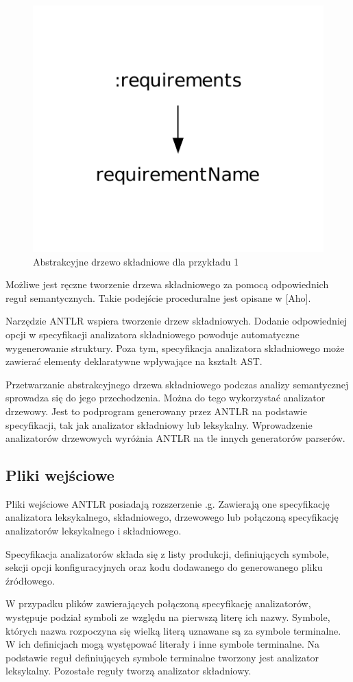 \begin{figure}[h!]
  \centering
    \includegraphics[scale=0.8]{img/antlr_ast.pdf}
    \caption{Abstrakcyjne drzewo składniowe dla przykładu 1}
    \label{antlr_ast}
\end{figure}


Możliwe jest ręczne tworzenie drzewa składniowego za pomocą odpowiednich
reguł semantycznych. Takie podejście proceduralne jest opisane w [Aho].

Narzędzie ANTLR wspiera tworzenie drzew składniowych. Dodanie
odpowiedniej opcji w specyfikacji analizatora składniowego powoduje automatyczne
wygenerowanie struktury. Poza tym, specyfikacja analizatora składniowego
 może zawierać elementy deklaratywne wpływające na kształt AST.


Przetwarzanie abstrakcyjnego drzewa składniowego podczas analizy semantycznej
sprowadza się do jego przechodzenia. Można do tego wykorzystać analizator drzewowy. 
Jest to podprogram generowany przez
ANTLR na podstawie specyfikacji, tak jak analizator składniowy lub leksykalny.
Wprowadzenie analizatorów drzewowych wyróżnia ANTLR na tle innych generatorów
 parserów. 

\subsection{Pliki wejściowe}

Pliki wejściowe ANTLR posiadają rozszerzenie .g. Zawierają one specyfikację
analizatora leksykalnego, składniowego, drzewowego lub połączoną specyfikację
analizatorów leksykalnego i składniowego. 

Specyfikacja analizatorów składa się z listy produkcji, definiujących symbole,
 sekcji opcji konfiguracyjnych oraz kodu dodawanego do generowanego
pliku źródłowego.

W przypadku plików zawierających połączoną specyfikację analizatorów, występuje
podział symboli ze względu na pierwszą literę ich nazwy.
 Symbole, których nazwa rozpoczyna się wielką literą uznawane są
za symbole terminalne. W ich definicjach mogą występować literały i inne
symbole terminalne. Na podstawie reguł definiujących symbole terminalne
tworzony jest analizator leksykalny. Pozostałe reguły tworzą analizator
składniowy.


